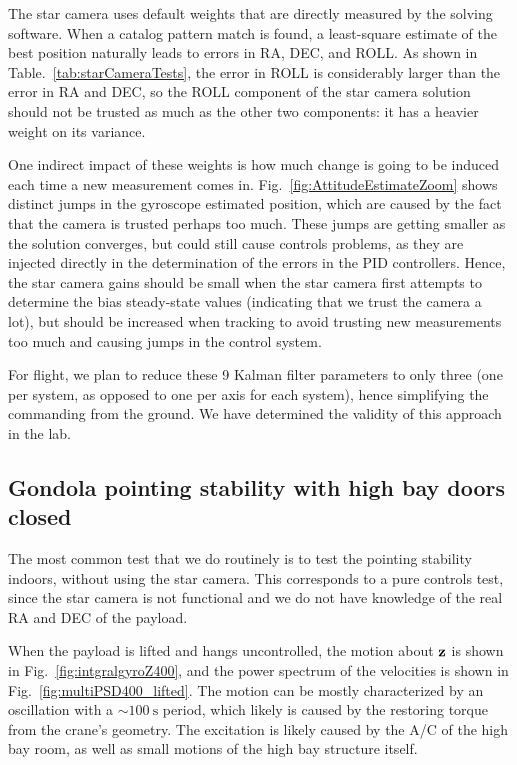 The star camera uses default weights that are directly measured by the solving software. When a catalog pattern match is found, a least-square estimate of the best position naturally leads to errors in RA, DEC, and ROLL. As shown in Table.~\ref{tab:starCameraTests}, the error in ROLL is considerably larger than the error in RA and DEC, so the ROLL component of the star camera solution should not be trusted as much as the other two components: it has a heavier weight on its variance. 

One indirect impact of these weights is how much change is going to be induced each time a new measurement comes in. Fig.~\ref{fig:AttitudeEstimateZoom} shows distinct jumps in the gyroscope estimated position, which are caused by the fact that the camera is trusted perhaps too much. These jumps are getting smaller as the solution converges, but could still cause controls problems, as they are injected directly in the determination of the errors in the PID controllers. Hence, the star camera gains should be small when the star camera first attempts to determine the bias steady-state values (indicating that we trust the camera a lot), but should be increased when tracking to avoid trusting new measurements too much and causing jumps in the control system. 

For flight, we plan to reduce these 9 Kalman filter parameters to only three (one per system, as opposed to one per axis for each system), hence simplifying the commanding from the ground. We have determined the validity of this approach in the lab.

\subsection{Gondola pointing stability with high bay doors closed}

The most common test that we do routinely is to test the pointing stability indoors, without using the star camera. This corresponds to a pure controls test, since the star camera is not functional and we do not have knowledge of the real RA and DEC of the payload. 

When the payload is lifted and hangs uncontrolled, the motion about $\textrm{\textbf{z}}$ is shown in Fig.~\ref{fig:intgralgyroZ400}, and the power spectrum of the velocities is shown in Fig.~\ref{fig:multiPSD400_lifted}. The motion can be mostly characterized by an oscillation with a $\sim\SI{100}{\second}$ period, which likely is caused by the restoring torque from the crane's geometry. The excitation is likely caused by the A/C of the high bay room, as well as small motions of the high bay structure itself.

